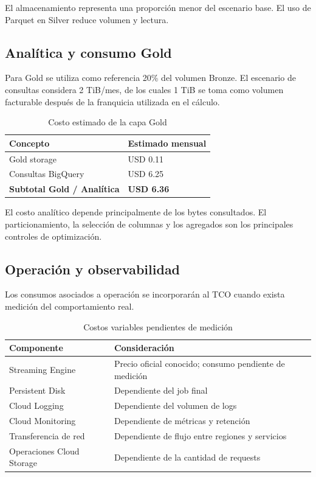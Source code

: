 \documentclass[11pt,a4paper]{article}
\begin{document}
El almacenamiento representa una proporción menor del escenario base. El uso de Parquet en Silver reduce volumen y lectura.

\subsection{Analítica y consumo Gold}
Para Gold se utiliza como referencia 20\% del volumen Bronze. El escenario de consultas considera 2 TiB/mes, de los cuales 1 TiB se toma como volumen facturable después de la franquicia utilizada en el cálculo.

\begin{table}[H]
\caption{Costo estimado de la capa Gold}\label{tab:costo-gold}
\small
\begin{tabularx}{\linewidth}{@{}XY@{}}\toprule
Concepto & Estimado mensual\\\midrule
Gold storage & USD 0.11\\
Consultas BigQuery & USD 6.25\\
\textbf{Subtotal Gold / Analítica} & \textbf{USD 6.36}\\\bottomrule
\end{tabularx}
\end{table}

El costo analítico depende principalmente de los bytes consultados. El particionamiento, la selección de columnas y los agregados son los principales controles de optimización.

\subsection{Operación y observabilidad}
Los consumos asociados a operación se incorporarán al TCO cuando exista medición del comportamiento real.

\begin{table}[H]
\caption{Costos variables pendientes de medición}\label{tab:costos-observabilidad}
\small
\begin{tabularx}{\linewidth}{@{}P{.38\linewidth}Y@{}}\toprule
Componente & Consideración\\\midrule
Streaming Engine & Precio oficial conocido; consumo pendiente de medición\\
Persistent Disk & Dependiente del job final\\
Cloud Logging & Dependiente del volumen de logs\\
Cloud Monitoring & Dependiente de métricas y retención\\
Transferencia de red & Dependiente de flujo entre regiones y servicios\\
Operaciones Cloud Storage & Dependiente de la cantidad de requests\\\bottomrule
\end{tabularx}
\end{table}
\end{document}
